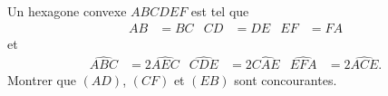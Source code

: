 \documentclass[varwidth]{standalone}
\begin{document}
    Un hexagone convexe $ABCDEF$ est tel que
    \begin{align*}
        AB & = BC & CD & = DE & EF & = FA
    \end{align*}
    et
    \begin{align*}
        \widehat{ABC} & = 2 \widehat{AEC} & \widehat{CDE} & = 2 \widehat{CAE} & \widehat{EFA} & = 2 \widehat{ACE}.
    \end{align*}
    Montrer que $(AD)$, $(CF)$ et $(EB)$ sont concourantes.
\end{document}
